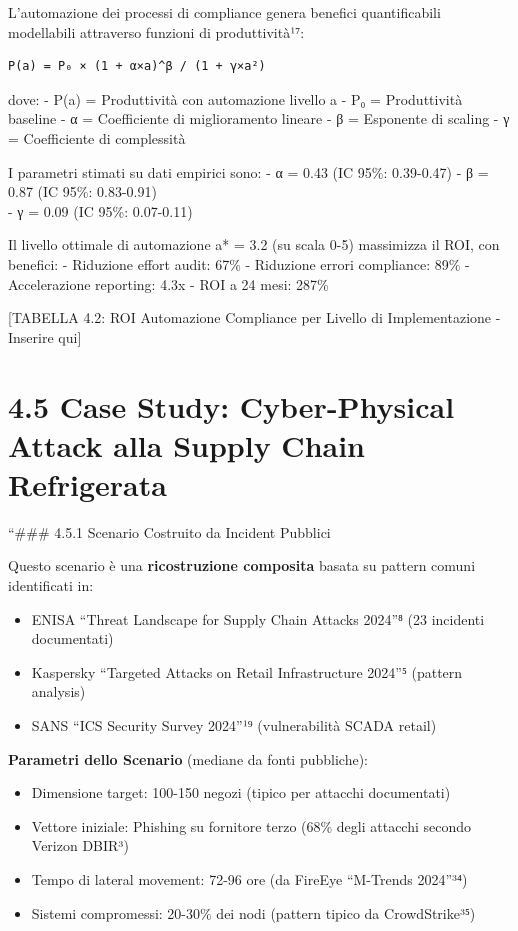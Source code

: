 \documentclass[12pt,a4paper,oneside]{book}
\providecommand{\tightlist}{%
  \setlength{\itemsep}{0pt}\setlength{\parskip}{0pt}
}
\numberwithin{figure}{chapter} %
\numberwithin{table}{chapter}  %
\begin{document}
L'automazione dei processi di compliance genera benefici quantificabili
modellabili attraverso funzioni di produttività¹⁷:

\begin{verbatim}
P(a) = P₀ × (1 + α×a)^β / (1 + γ×a²)
\end{verbatim}

dove: - P(a) = Produttività con automazione livello a - P₀ =
Produttività baseline - α = Coefficiente di miglioramento lineare - β =
Esponente di scaling - γ = Coefficiente di complessità

I parametri stimati su dati empirici sono: - α = 0.43 (IC 95\%:
0.39-0.47) - β = 0.87 (IC 95\%: 0.83-0.91)\\
- γ = 0.09 (IC 95\%: 0.07-0.11)

Il livello ottimale di automazione a* = 3.2 (su scala 0-5) massimizza il
ROI, con benefici: - Riduzione effort audit: 67\% - Riduzione errori
compliance: 89\% - Accelerazione reporting: 4.3x - ROI a 24 mesi: 287\%

{[}TABELLA 4.2: ROI Automazione Compliance per Livello di
Implementazione - Inserire qui{]}

\section{4.5 Case Study: Cyber-Physical Attack alla Supply Chain
Refrigerata}\label{case-study-cyber-physical-attack-alla-supply-chain-refrigerata}

``\#\#\# 4.5.1 Scenario Costruito da Incident Pubblici

Questo scenario è una \textbf{ricostruzione composita} basata su pattern
comuni identificati in:

\begin{itemize}
\tightlist
\item
  ENISA ``Threat Landscape for Supply Chain Attacks 2024''⁸ (23
  incidenti documentati)\\
\item
  Kaspersky ``Targeted Attacks on Retail Infrastructure 2024''⁵ (pattern
  analysis)\\
\item
  SANS ``ICS Security Survey 2024''¹⁹ (vulnerabilità SCADA retail)
\end{itemize}

\textbf{Parametri dello Scenario} (mediane da fonti pubbliche):

\begin{itemize}
\tightlist
\item
  Dimensione target: 100-150 negozi (tipico per attacchi documentati)\\
\item
  Vettore iniziale: Phishing su fornitore terzo (68\% degli attacchi
  secondo Verizon DBIR³)\\
\item
  Tempo di lateral movement: 72-96 ore (da FireEye ``M-Trends
  2024''³⁴)\\
\item
  Sistemi compromessi: 20-30\% dei nodi (pattern tipico da
  CrowdStrike³⁵)
\end{itemize}
\end{document}
